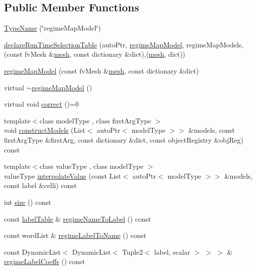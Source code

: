 \subsection*{Public Member Functions}
\begin{DoxyCompactItemize}
\item 
\hyperlink{classFoam_1_1regimeMapModel_a0ad8422d6de60517bdf7706035e3deb6}{Type\+Name} (\char`\"{}regime\+Map\+Model\char`\"{})
\item 
\hyperlink{classFoam_1_1regimeMapModel_a6e3b82f645006ca2ba2d2e6df5597c47}{declare\+Run\+Time\+Selection\+Table} (auto\+Ptr, \hyperlink{classFoam_1_1regimeMapModel}{regime\+Map\+Model}, regime\+Map\+Models,(const fv\+Mesh \&\hyperlink{createMeshesPostProcess_8H_a8bb1e58291d2d2b653e024a4f4bffe38}{mesh}, const dictionary \&dict),(\hyperlink{createMeshesPostProcess_8H_a8bb1e58291d2d2b653e024a4f4bffe38}{mesh}, dict))
\item 
\hyperlink{classFoam_1_1regimeMapModel_ad19256b66990468e25c2300bdd854d82}{regime\+Map\+Model} (const fv\+Mesh \&\hyperlink{createMeshesPostProcess_8H_a8bb1e58291d2d2b653e024a4f4bffe38}{mesh}, const dictionary \&dict)
\item 
virtual \hyperlink{classFoam_1_1regimeMapModel_acbb76b27a8b436fca172065c5b854903}{$\sim$regime\+Map\+Model} ()
\item 
virtual void \hyperlink{classFoam_1_1regimeMapModel_a7e204aa62fa1c1f527e8f1c62dc62061}{correct} ()=0
\item 
{\footnotesize template$<$class model\+Type , class first\+Arg\+Type $>$ }\\void \hyperlink{classFoam_1_1regimeMapModel_a75137c3a54497f5a54aae0090b43166f}{construct\+Models} (List$<$ auto\+Ptr$<$ model\+Type $>$$>$ \&models, const first\+Arg\+Type \&first\+Arg, const dictionary \&dict, const object\+Registry \&obj\+Reg) const
\item 
{\footnotesize template$<$class value\+Type , class model\+Type $>$ }\\value\+Type \hyperlink{classFoam_1_1regimeMapModel_a7a7a9bf89a3c433b76ce23b9f7eaabbf}{interpolate\+Value} (const List$<$ auto\+Ptr$<$ model\+Type $>$$>$ \&models, const label \&celli) const
\item 
int \hyperlink{classFoam_1_1regimeMapModel_af9593d4a5ff4274efaf429cb4f9e57cc}{size} () const
\item 
const \hyperlink{classFoam_1_1regimeMapModel_a5b5512e1ee06ad6419a57dd400b53807}{label\+Table} \& \hyperlink{classFoam_1_1regimeMapModel_ae5c6e8c83ecc0e1a95fcec6c4923e527}{regime\+Name\+To\+Label} () const
\item 
const word\+List \& \hyperlink{classFoam_1_1regimeMapModel_a4b943f8f62001d3ff09053acf54dbe86}{regime\+Label\+To\+Name} () const
\item 
const Dynamic\+List$<$ Dynamic\+List$<$ Tuple2$<$ label, scalar $>$ $>$ $>$ \& \hyperlink{classFoam_1_1regimeMapModel_a0280c9d0b2f37638a0fa3f5f974b9ec7}{regime\+Label\+Coeffs} () const
\end{DoxyCompactItemize}
